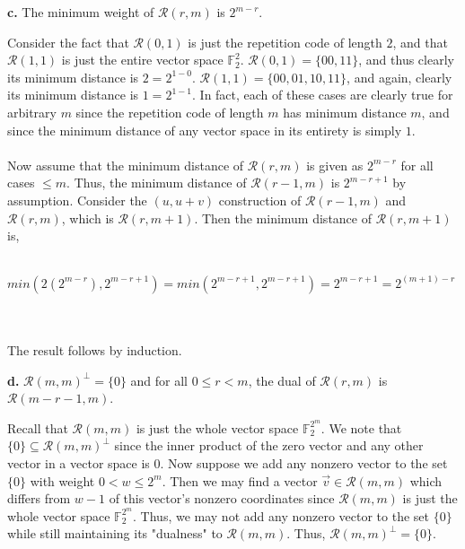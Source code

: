 \documentclass[12pt]{article}
\begin{document}
\begin{adjustwidth}{0.5cm}{}
\begin{adjustwidth}{0.5cm}{}
	\end{adjustwidth}
\textbf{c.} The minimum weight of $\mathcal{R}(r, m)$ is $2^{m - r}$.\\
	\begin{adjustwidth}{0.5cm}{}
	Consider the fact that $\mathcal{R}(0, 1)$ is just the repetition code of length $2$, and that $\mathcal{R}(1, 1)$ is just the entire vector space $\mathbb{F}_2^2$.  $\mathcal{R}(0, 1) = \{00, 11\}$, and thus clearly its minimum distance is $2 = 2^{1 - 0}$.  $\mathcal{R}(1, 1) = \{00, 01, 10, 11\}$, and again, clearly its minimum distance is $1 = 2^{1 - 1}$.  In fact, each of these cases are clearly true for arbitrary $m$ since the repetition code of length $m$ has minimum distance $m$, and since the minimum distance of any vector space in its entirety is simply $1$.\\\\
	Now assume that the minimum distance of $\mathcal{R}(r, m)$ is given as $2^{m - r}$ for all cases $\leq m$.  Thus, the minimum distance of $\mathcal{R}(r-1, m)$ is $2^{m - r + 1}$ by assumption.  Consider the $(u, u+v)$ construction of $\mathcal{R}(r - 1, m)$ and $\mathcal{R}(r, m)$, which is $\mathcal{R}(r, m+1)$.  Then the minimum distance of $\mathcal{R}(r, m+1)$ is,\\\\
	\centerline{$min(2(2^{m - r}), 2^{m - r + 1}) = min(2^{m - r + 1}, 2^{m - r + 1}) = 2^{m - r + 1} = 2^{(m + 1) - r}$}\\\\
	The result follows by induction.\\
	\end{adjustwidth}
\textbf{d.} $\mathcal{R}(m, m)^{\bot} = \{0\}$ and for all $0 \leq r < m$, the dual of $\mathcal{R}(r, m)$ is $\mathcal{R}(m-r-1, m)$.\\
	\begin{adjustwidth}{0.5cm}{}
	Recall that $\mathcal{R}(m, m)$ is just the whole vector space $\mathbb{F}_2^{2^m}$.  We note that $\{0\} \subseteq \mathcal{R}(m, m)^{\bot}$ since the inner product of the zero vector and any other vector in a vector space is $0$.  Now suppose we add any nonzero vector to the set $\{0\}$ with weight $0 < w \leq 2^m$.  Then we may find a vector $\vec{v} \in \mathcal{R}(m, m)$ which differs from $w - 1$ of this vector's nonzero coordinates since $\mathcal{R}(m, m)$ is just the whole vector space $\mathbb{F}_2^{2^m}$.  Thus, we may not add any nonzero vector to the set $\{0\}$ while still maintaining its "dualness" to $\mathcal{R}(m, m)$.  Thus, $\mathcal{R}(m, m)^{\bot} = \{0\}$.\\\\

\end{adjustwidth}
\end{adjustwidth}
\end{document}
